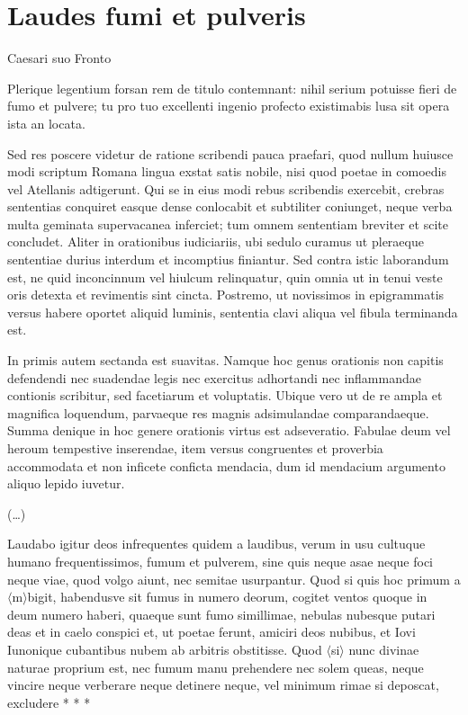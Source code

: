 
\section*{Laudes fumi et pulveris}
	
Caesari suo Fronto

\medskip

\noindent Plerique legentium forsan rem de titulo contemnant: nihil serium potuisse fieri de fumo et pulvere; tu pro tuo excellenti ingenio profecto existimabis lusa sit opera ista an locata. 	

Sed res poscere videtur de ratione scribendi pauca praefari, quod nullum huiusce modi scriptum Romana lingua exstat satis nobile, nisi quod poetae in comoedis vel Atellanis adtigerunt. Qui se in eius modi rebus scribendis exercebit, crebras sententias conquiret easque dense conlocabit et subtiliter coniunget, neque verba multa geminata supervacanea inferciet; tum omnem sententiam breviter et scite concludet. Aliter in orationibus iudiciariis, ubi sedulo curamus ut pleraeque sententiae durius interdum et incomptius finiantur. Sed contra istic laborandum est, ne quid inconcinnum vel hiulcum relinquatur, quin omnia ut in tenui veste oris detexta et revimentis sint cincta. Postremo, ut novissimos in epigrammatis versus habere oportet aliquid luminis, sententia clavi aliqua vel fibula terminanda est. 	

In primis autem sectanda est suavitas. Namque hoc genus orationis non capitis defendendi nec suadendae legis nec exercitus adhortandi nec inflammandae contionis scribitur, sed facetiarum et voluptatis. Ubique vero ut de re ampla et magnifica loquendum, parvaeque res magnis adsimulandae comparandaeque. Summa denique in hoc genere orationis virtus est adseveratio. Fabulae deum vel heroum tempestive inserendae, item versus congruentes et proverbia accommodata et non inficete conficta mendacia, dum id mendacium argumento aliquo lepido iuvetur.

(\dots)

Laudabo igitur deos infrequentes quidem a laudibus, verum in usu cultuque humano frequentissimos, fumum et pulverem, sine quis neque asae neque foci neque viae, quod volgo aiunt, nec semitae usurpantur. Quod si quis hoc primum a$\langle$m$\rangle$bigit, habendusve sit fumus in numero deorum, cogitet ventos quoque in deum numero haberi, quaeque sunt fumo simillimae, nebulas nubesque putari deas et in caelo conspici et, ut poetae ferunt, amiciri deos nubibus, et Iovi Iunonique cubantibus nubem ab arbitris obstitisse. Quod $\langle$si$\rangle$ nunc divinae naturae proprium est, nec fumum manu prehendere nec solem queas, neque vincire neque verberare neque detinere neque, vel minimum rimae si deposcat, excludere * * * 
